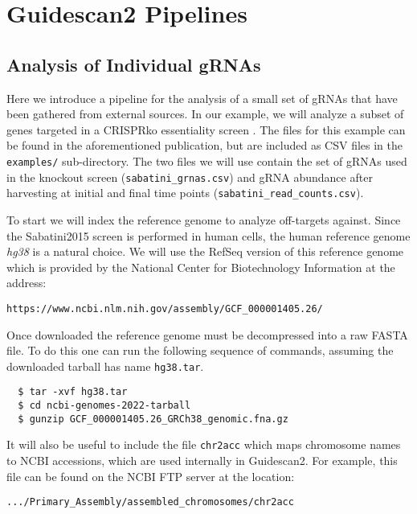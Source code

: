 \documentclass[11pt]{article}
\begin{document}
\section{Guidescan2 Pipelines}
\subsection{Analysis of Individual gRNAs}
Here we introduce a pipeline for the analysis of a small set of gRNAs
that have been gathered from external sources. In our example, we will
analyze a subset of genes targeted in a CRISPRko essentiality screen
\parencite{Wang1096}.  The files for this example can be found in the
aforementioned publication, but are included as CSV files in the
\texttt{examples/} sub-directory. The two files we will use contain
the set of gRNAs used in the knockout screen
(\texttt{sabatini\_grnas.csv}) and gRNA abundance after harvesting at
initial and final time points (\texttt{sabatini\_read\_counts.csv}).

To start we will index the reference genome to analyze off-targets
against. Since the Sabatini2015 screen is performed in human cells,
the human reference genome \textit{hg38} is a natural choice. We will
use the RefSeq version of this reference genome which is provided by
the National Center for Biotechnology Information at the address:

\begin{center}
\texttt{https://www.ncbi.nlm.nih.gov/assembly/GCF\_000001405.26/}
\end{center}

Once downloaded the reference genome must be decompressed into a raw
FASTA file.  To do this one can run the following sequence of
commands, assuming the downloaded tarball has name \texttt{hg38.tar}.

\begin{verbatim}
  $ tar -xvf hg38.tar
  $ cd ncbi-genomes-2022-tarball
  $ gunzip GCF_000001405.26_GRCh38_genomic.fna.gz
\end{verbatim}

It will also be useful to include the file \texttt{chr2acc} which maps
chromosome names to NCBI accessions, which are used internally in
Guidescan2. For example, this file can be found on the NCBI FTP server
at the location:

\begin{center}
\texttt{.../Primary\_Assembly/assembled\_chromosomes/chr2acc}
\end{center}
\end{document}
